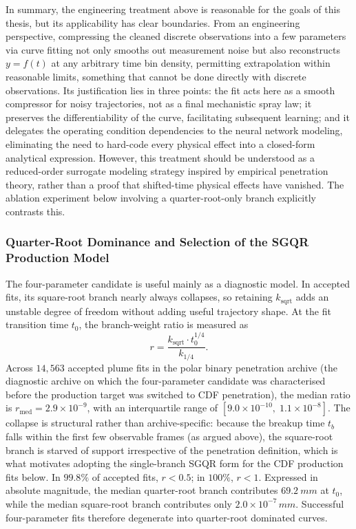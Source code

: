 In summary, the engineering treatment above is reasonable for the goals of this thesis, but its applicability has clear boundaries. From an engineering perspective, compressing the cleaned discrete observations into a few parameters via curve fitting not only smooths out measurement noise but also reconstructs $y = f(t)$ at any arbitrary time bin density, permitting extrapolation within reasonable limits, something that cannot be done directly with discrete observations. Its justification lies in three points: the fit acts here as a smooth compressor for noisy trajectories, not as a final mechanistic spray law; it preserves the differentiability of the curve, facilitating subsequent learning; and it delegates the operating condition dependencies to the neural network modeling, eliminating the need to hard-code every physical effect into a closed-form analytical expression. However, this treatment should be understood as a reduced-order surrogate modeling strategy inspired by empirical penetration theory, rather than a proof that shifted-time physical effects have vanished. The ablation experiment below involving a quarter-root-only branch explicitly contrasts this.

\subsubsection{Quarter-Root Dominance and Selection of the SGQR Production Model}

The four-parameter candidate is useful mainly as a diagnostic model. In accepted fits, its square-root branch nearly always collapses, so retaining \(k_{\mathrm{sqrt}}\) adds an unstable degree of freedom without adding useful trajectory shape. At the fit transition time \(t_0\), the branch-weight ratio is measured as
\[
r = \frac{k_{\mathrm{sqrt}}\cdot t_0^{1/4}}{k_{1/4}}.
\]
Across \(14{,}563\) accepted plume fits in the polar binary penetration archive (the diagnostic archive on which the four-parameter candidate was characterised before the production target was switched to CDF penetration), the median ratio is \(r_{\mathrm{med}}=2.9\times10^{-9}\), with an interquartile range of \([9.0\times10^{-10},\;1.1\times10^{-8}]\). The collapse is structural rather than archive-specific: because the breakup time \(t_b\) falls within the first few observable frames (as argued above), the square-root branch is starved of support irrespective of the penetration definition, which is what motivates adopting the single-branch SGQR form for the CDF production fits below. In \(99.8\%\) of accepted fits, \(r<0.5\); in \(100\%\), \(r<1\). Expressed in absolute magnitude, the median quarter-root branch contributes \(\SI{69.2}{mm}\) at \(t_0\), while the median square-root branch contributes only \(2.0\times10^{-7}\,\si{mm}\). Successful four-parameter fits therefore degenerate into quarter-root dominated curves.

